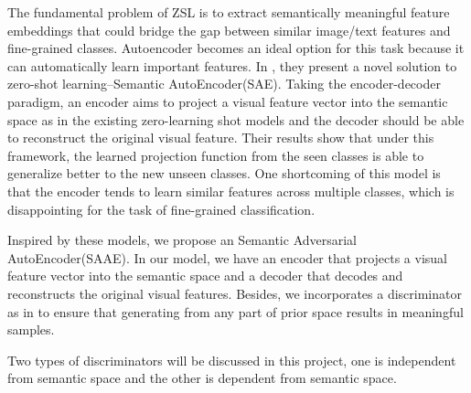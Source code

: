 \documentclass{article}
\begin{document}
 \par 

The fundamental problem of ZSL is to extract semantically meaningful feature embeddings that could bridge the gap between similar image/text features and fine-grained classes. Autoencoder becomes an ideal option for this task because it can automatically learn important features. In \cite{kodirov2017semantic}, they present a novel solution to zero-shot learning--Semantic AutoEncoder(SAE). Taking the encoder-decoder paradigm, an encoder aims to project a visual feature vector into the semantic space as in the existing zero-learning shot models and the decoder should be able to reconstruct the original visual feature. Their results show that under this framework, the learned projection function from the seen classes is able to generalize better to the new unseen classes. One shortcoming of this model is that the encoder tends to learn similar features across multiple classes, which is disappointing for the task of fine-grained classification. 

Inspired by these models, we propose an Semantic Adversarial AutoEncoder(SAAE). In our model, we have an encoder that projects a visual feature vector into the semantic space and a decoder that decodes and reconstructs the original visual features. Besides, we incorporates a discriminator as in \cite{makhzani2015adversarial} to ensure that generating from any part of prior space results in meaningful samples.

Two types of discriminators will be discussed in this project, one is independent from semantic space and the other is dependent from semantic space. 

\end{document}
